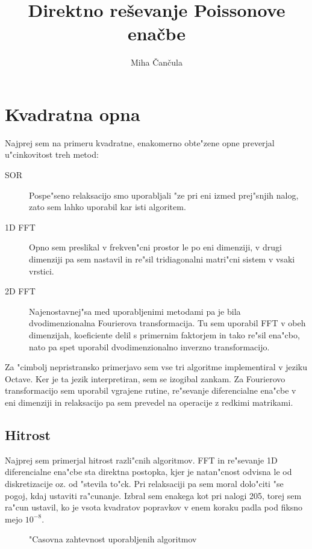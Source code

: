 \documentclass[a4paper,10pt]{article}
\title{Direktno re\v sevanje Poissonove ena\v cbe}
\author{Miha \v Can\v cula}
\begin{document}
\maketitle

\section{Kvadratna opna}

Najprej sem na primeru kvadratne, enakomerno obte"zene opne preverjal u"cinkovitost treh metod:

\begin{description}
  \item[SOR] Pospe"seno relaksacijo smo uporabljali "ze pri eni izmed prej"snjih nalog, zato sem lahko uporabil kar isti algoritem. 
  \item[1D FFT] Opno sem preslikal v frekven"cni prostor le po eni dimenziji, v drugi dimenziji pa sem nastavil in re"sil tridiagonalni matri"cni sistem v vsaki vrstici. 
  \item[2D FFT] Najenostavnej"sa med uporabljenimi metodami pa je bila dvodimenzionalna Fourierova transformacija. Tu sem uporabil FFT v obeh dimenzijah, koeficiente delil s primernim faktorjem in tako re"sil ena"cbo, nato pa spet uporabil dvodimenzionalno inverzno transformacijo. 
  
\end{description}

Za "cimbolj nepristransko primerjavo sem vse tri algoritme implementiral v jeziku Octave. Ker je ta jezik interpretiran, sem se izogibal zankam. Za Fourierovo transformacijo sem uporabil vgrajene rutine, re"sevanje diferencialne ena"cbe v eni dimenziji in relaksacijo pa sem prevedel na operacije z redkimi matrikami. 

\subsection{Hitrost}

Najprej sem primerjal hitrost razli"cnih algoritmov. FFT in re"sevanje 1D diferencialne ena"cbe sta direktna postopka, kjer je natan"cnost odvisna le od diskretizacije oz. od "stevila to"ck. Pri relaksaciji pa sem moral dolo"citi "se pogoj, kdaj ustaviti ra"cunanje. Izbral sem enakega kot pri nalogi 205, torej sem ra"cun ustavil, ko je vsota kvadratov popravkov v enem koraku padla pod fiksno mejo $10^{-8}$. 

\begin{figure}[H]

\caption{"Casovna zahtevnost uporabljenih algoritmov}
\label{fig:hitrost}  
\end{figure}
\end{document}
